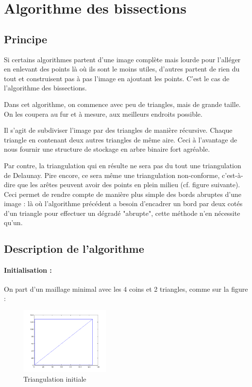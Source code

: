 \documentclass{report}
\begin{document}
\section{Algorithme des bissections}

\subsection{Principe}

Si certains algorithmes partent d'une image complète mais lourde pour l'alléger en enlevant des points là où ils sont le moins utiles, d'autres partent de rien du tout et construisent pas à pas l'image en ajoutant les points. C'est le cas de l'algorithme des bissections.

Dans cet algorithme, on commence avec peu de triangles, mais de grande taille. On les coupera au fur et à mesure, aux meilleurs endroits possible.

Il s'agit de subdiviser l'image par des triangles de manière récursive. Chaque triangle en contenant deux autres triangles de même aire. Ceci à l'avantage de nous fournir une structure de stockage en arbre binaire fort agréable. 

Par contre, la triangulation qui en résulte ne sera pas du tout une triangulation de Delaunay. Pire encore, ce sera même une triangulation non-conforme, c'est-à-dire que les arêtes peuvent avoir des points en plein milieu (cf. figure suivante). Ceci permet de rendre compte de manière plus simple des bords abruptes d'une image : là où l'algorithme précédent a besoin d'encadrer un bord par deux cotés d'un triangle pour effectuer un dégradé "abrupte", cette méthode n'en nécessite qu'un.

\subsection{Description de l'algorithme}

\paragraph{Initialisation :}

On part d'un maillage minimal avec les 4 coins et 2 triangles, comme sur la figure :

\clearpage

\begin{figure}[ht]
\centering
\includegraphics[width=0.4\textwidth]{beginBissect.png}
\caption{Triangulation initiale}
\end{figure}
\end{document}
